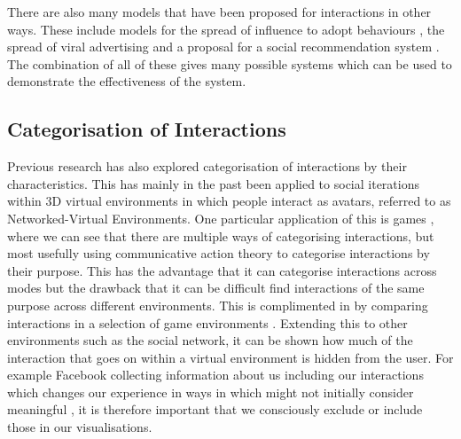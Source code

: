 \documentclass[12pt,a4paper]{article}
\begin{document}
There are also many models that have been proposed for interactions in other ways. These include models for the spread of influence to adopt behaviours \cite{kempe2003maximizing}, the spread of viral advertising \cite{van2010viral} and a proposal for a social recommendation system \cite{walter2008model}. The combination of all of these gives many possible systems which can be used to demonstrate the effectiveness of the system.

\subsection{Categorisation of Interactions}
\noindent
Previous research has also explored categorisation of interactions by their characteristics. This has mainly in the past been applied to social iterations within 3D virtual environments in which people interact as avatars, referred to as Networked-Virtual Environments. One particular application of this is games \cite{manninen2000interaction}, where we can see that there are multiple ways of categorising interactions, but most usefully using communicative action theory to categorise interactions by their purpose. This has the advantage that it can categorise interactions across modes but the drawback that it can be difficult find interactions of the same purpose across different environments. This is complimented in by comparing interactions in a selection of game environments \cite{becker2002social}. Extending this to other environments such as the social network, it can be shown how much of the interaction that goes on within a virtual environment is hidden from the user. For example Facebook collecting information about us including our interactions which changes our experience in ways in which might not initially consider meaningful \cite{schneier2010taxonomy}, it is therefore important that we consciously exclude or include those in our visualisations.

\end{document}
